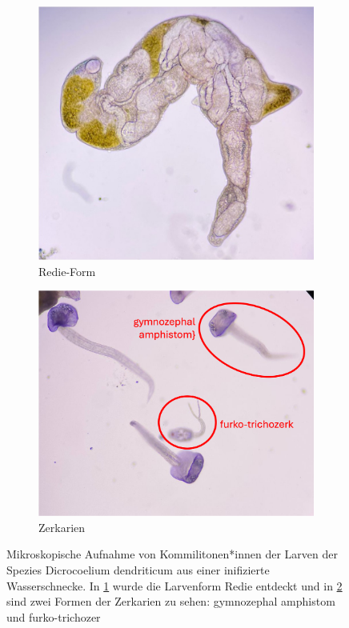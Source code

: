 \documentclass[oneside,10pt,a4paper]{report}
\begin{document}
				\begin{figure}[H]
					\centering
					\begin{subfigure}[b]{0.4\textwidth}
						\includegraphics[width=\textwidth]{Redie.jpg}
						\caption{Redie-Form}
						\label{fig:Redie}
					\end{subfigure}
					\hfill
					\begin{subfigure}[b]{0.45\textwidth}
						\includegraphics[width=\textwidth]{Zerkarien.png}
						\caption{Zerkarien}
						\label{fig: Zerkarien}
					\end{subfigure}
					\caption{Mikroskopische Aufnahme von Kommilitonen*innen der Larven der Spezies  Dicrocoelium dendriticum aus einer inifizierte Wasserschnecke. In \ref{fig:Redie} wurde die Larvenform Redie entdeckt und  in \ref{fig: Zerkarien} sind zwei Formen der Zerkarien zu sehen: gymnozephal amphistom und furko-trichozer}
					\label{fig: Trematodenlarven}
				\end{figure}
				
\end{document}

